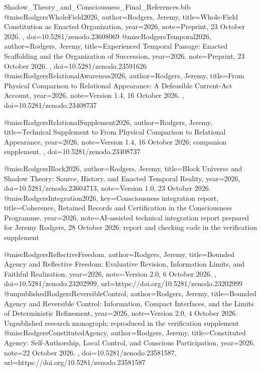 \begin{filecontents*}[overwrite]{Shadow_Theory_and_Consciousness_Final_References.bib}
@misc{RodgersWholeField2026,
 author={Rodgers, Jeremy},
 title={Whole-Field Constitution as Enacted Organization},
 year={2026},
 note={Preprint, 23 October 2026. },
 doi={10.5281/zenodo.23608069}
}
@misc{RodgersTemporal2026,
 author={Rodgers, Jeremy},
 title={Experienced Temporal Passage: Enacted Scaffolding and the Organization of Succession},
 year={2026},
 note={Preprint, 23 October 2026. },
 doi={10.5281/zenodo.23591626}
}
@misc{RodgersRelationalAwareness2026,
 author={Rodgers, Jeremy},
 title={From Physical Comparison to Relational Appearance: A Defeasible Current-Act Account},
 year={2026},
 note={Version 1.4, 16 October 2026. },
 doi={10.5281/zenodo.23408737}
}


@misc{RodgersRelationalSupplement2026,
 author={Rodgers, Jeremy},
 title={Technical Supplement to From Physical Comparison to Relational Appearance},
 year={2026},
 note={Version 1.4, 16 October 2026; companion supplement. },
 doi={10.5281/zenodo.23408737}
}


@misc{RodgersBlock2026,
 author={Rodgers, Jeremy},
 title={Block Universe and Shadow Theory: Source, History, and Enacted Temporal Reality},
 year={2026},
 doi={10.5281/zenodo.23604713},
 note={Version 1.0, 23 October 2026. }
}
@misc{RodgersIntegration2026,
 key={Consciousness integration report},
 title={Coherence, Retained Records and Certification in the Consciousness Programme},
 year={2026},
 note={AI-assisted technical integration report prepared for Jeremy Rodgers, 28 October 2026; report and checking code in the verification supplement}
}


@misc{RodgersReflectiveFreedom,
 author={Rodgers, Jeremy},
 title={Bounded Agency and Reflective Freedom: Evaluative Revision, Information Limits, and Faithful Realization},
 year={2026},
 note={Version 2.0, 6 October 2026. },
 doi={10.5281/zenodo.23202999},
 url={https://doi.org/10.5281/zenodo.23202999}
}
@unpublished{RodgersReversibleControl,
 author={Rodgers, Jeremy},
 title={Bounded Agency and Reversible Control: Information, Compact Interfaces, and the Limits of Deterministic Refinement},
 year={2026},
 note={Version 2.0, 4 October 2026. Unpublished research monograph; reproduced in the verification supplement}
}
@misc{RodgersConstitutedAgency,
 author={Rodgers, Jeremy},
 title={Constituted Agency: Self-Authorship, Local Control, and Conscious Participation},
 year={2026},
 note={22 October 2026. },
 doi={10.5281/zenodo.23581587},
 url={https://doi.org/10.5281/zenodo.23581587}
}



\end{filecontents*}
